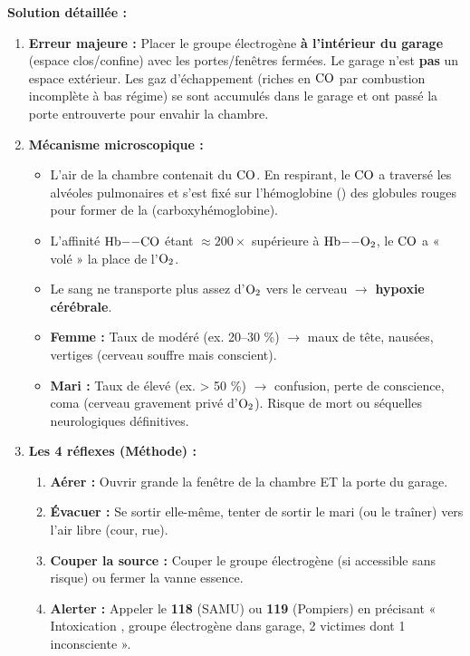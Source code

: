 \documentclass[11pt]{article}
\begin{document}
\begin{exoresolu}
\tcblower
\textbf{Solution détaillée :}
\begin{enumerate}
    \item \textbf{Erreur majeure :} Placer le groupe électrogène \textbf{à l'intérieur du garage} (espace clos/confine) avec les portes/fenêtres fermées. Le garage n'est \textbf{pas} un espace extérieur. Les gaz d'échappement (riches en $\ce{CO}$ par combustion incomplète à bas régime) se sont accumulés dans le garage et ont passé la porte entrouverte pour envahir la chambre.
    \item \textbf{Mécanisme microscopique :}
    \begin{itemize}
        \item L'air de la chambre contenait du $\ce{CO}$. En respirant, le $\ce{CO}$ a traversé les alvéoles pulmonaires et s'est fixé sur l'hémoglobine () des globules rouges pour former de la  (carboxyhémoglobine).
        \item L'affinité $\ce{Hb--CO}$ étant $\approx 200\times$ supérieure à $\ce{Hb--O2}$, le $\ce{CO}$ a « volé » la place de l'$\ce{O2}$.
        \item Le sang ne transporte plus assez d'$\ce{O2}$ vers le cerveau $\rightarrow$ \textbf{hypoxie cérébrale}.
        \item \textbf{Femme :} Taux de  modéré (ex. 20--30 \%) $\rightarrow$ maux de tête, nausées, vertiges (cerveau souffre mais conscient).
        \item \textbf{Mari :} Taux de  élevé (ex. > 50 \%) $\rightarrow$ confusion, perte de conscience, coma (cerveau gravement privé d'$\ce{O2}$). Risque de mort ou séquelles neurologiques définitives.
    \end{itemize}
    \item \textbf{Les 4 réflexes (Méthode) :}
    \begin{enumerate}
        \item \textbf{Aérer :} Ouvrir grande la fenêtre de la chambre ET la porte du garage.
        \item \textbf{Évacuer :} Se sortir elle-même, tenter de sortir le mari (ou le traîner) vers l'air libre (cour, rue).
        \item \textbf{Couper la source :} Couper le groupe électrogène (si accessible sans risque) ou fermer la vanne essence.
        \item \textbf{Alerter :} Appeler le \textbf{118} (SAMU) ou \textbf{119} (Pompiers) en précisant « Intoxication , groupe électrogène dans garage, 2 victimes dont 1 inconsciente ».

\end{enumerate}
\end{enumerate}
\end{exoresolu}
\end{document}

